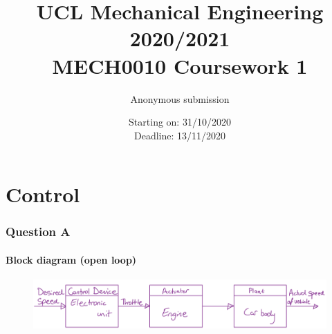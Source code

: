 \documentclass[12pt]{article}
\numberwithin{equation}{section}
\begin{document}
\title{\textbf{UCL Mechanical Engineering 2020/2021}\\MECH0010 Coursework 1}
\date{Starting on: 31/10/2020\\Deadline: 13/11/2020}
\author{Anonymous submission}
\maketitle
\tableofcontents
\newpage
\part{Control}
\section{Question A}
\subsection{Block diagram (open loop)}
\begin{figure}[H]
  \centering
  \includegraphics[width=\textwidth]{./img/1-1blockdiagram.png}
\end{figure}
\end{document}
